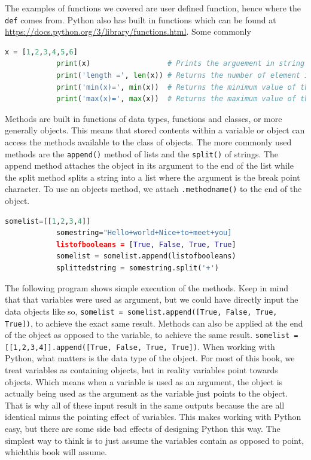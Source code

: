 \documentclass[11pt,a4paper]{book}
\begin{document}
			The examples of functions we covered are user defined function, hence where the \lstinline|def| comes from. Python also has built in functions which can be found at \url{https://docs.python.org/3/library/functions.html}. Some commonly 
			
			\begin{lstlisting}[language=Python, caption = Python's builtin function. We can also call builtin functions from within builtin functions as demonstrated]
			x = [1,2,3,4,5,6]
			print(x)                  # Prints the arguement in string form
			print('length =', len(x)) # Returns the number of element in the data structure
			print('min(x)=', min(x))  # Returns the minimum value of the data structure
			print('max(x)=', max(x))  # Returns the maximum value of the data structure
			\end{lstlisting}
			
			Methods are built in functions of data types, functions and classes, or more generally objects. This means that stored contents within a variable or object can access the methods available to the class of objects. The more commonly used methods are the \lstinline{append()} method of lists and the \lstinline{split()} of strings. The append method attaches the object in its argument to the end of the list while the split method splits a string into a list where the argument is the break point character. To use an objects method, we attach \lstinline|.methodname()| to the end of the object. 
			
			\begin{lstlisting}[language = Python, caption = Examples of append and split methods of lists and strings]
			somelist=[[1,2,3,4]]
			somestring="Hello+world+Nice+to+meet+you]
			listofbooleans = [True, False, True, True]
			somelist = somelist.append(listofbooleans)
			splittedstring = somestring.split('+')
			\end{lstlisting}
			\noindent The following program shows simple execution of the methods. Keep in mind that that variables were used as argument, but we could have directly input the data objects like so, \lstinline|somelist = somelist.append([True, False, True, True])|, to achieve the exact same result. Methods can also be applied at the end of the object as opposed to the variable, to achieve the same result. \lstinline|somelist = [[1,2,3,4]].append([True, False, True, True])|. When working with Python, what matters is the data type of the object. For most of this book, we treat variables as containing objects, but in reality variables point towards objects. Which means when a variable is used as an argument, the object is actually being used as the argument as the variable just points to the object. That is why all of these input result in the same outputs because the are all identical minus the pointing effect of variables. This makes working with Python easy, but there are some side bad effects of designing Python this way. The simplest way to think is to just assume the variables contain as opposed to point, whichthis book will assume. 
			
\end{document}
